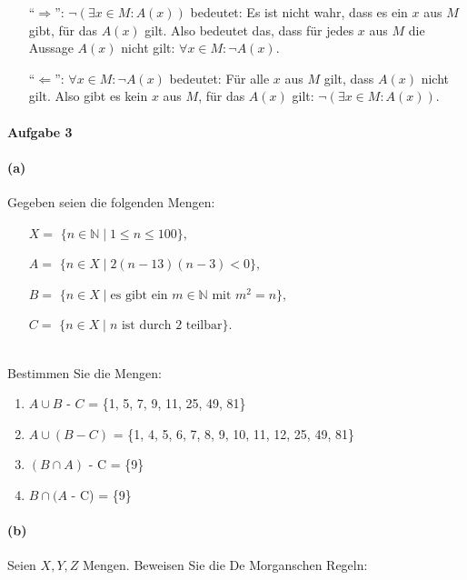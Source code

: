 \documentclass[12pt, letterpaper]{article}
\begin{document}
\begin{enumerate}
    \item[]{``$\Rightarrow$'':}
            $\neg \left( \exists x \in M : A(x) \right)$ bedeutet: Es ist nicht wahr, dass es ein $x$ aus $M$ gibt, für das $A(x)$ gilt.
            Also bedeutet das, dass für jedes $x$ aus $M$ die Aussage $A(x)$ nicht gilt: $\forall x \in M : \neg A(x)$.
    \item[]{``$\Leftarrow$'':}
           $\forall x \in M : \neg A(x)$ bedeutet: Für alle $x$ aus $M$ gilt, dass $A(x)$ nicht gilt. Also gibt es kein $x$ aus $M$, für das $A(x)$ gilt: $\neg \left( \exists x \in M : A(x) \right)$.
\end{enumerate}





\paragraph{Aufgabe 3}

\paragraph{(a)} Gegeben seien die folgenden Mengen:

\begin{enumerate}
    \item[$X =$] $\{n \in \mathbb{N} \mid 1 \leq n \leq 100\},$
    \item[$A =$] $\{n \in X \mid 2(n - 13)(n - 3) < 0\},$
    \item[$B =$] $\{n \in X \mid \text{es gibt ein } m \in \mathbb{N} \text{ mit } m^2 = n\},$
    \item[$C =$] $\{n \in X \mid n \text{ ist durch 2 teilbar}\}.$
\end{enumerate}\\

\noindent Bestimmen Sie die Mengen:

\begin{enumerate}
    \item $A \cup B$ - $C$ = \{1, 5, 7, 9, 11, 25, 49, 81\}
    \item $A \cup (B - C)$ = \{1, 4, 5, 6, 7, 8, 9, 10, 11, 12, 25, 49, 81\}
    \item $(B \cap A)$ - C = \{9\}
    \item $B \cap (A$ - C) = \{9\}
\end{enumerate}

\paragraph{(b)} Seien $X, Y, Z$ Mengen. Beweisen Sie die De Morganschen Regeln:
\end{document}
